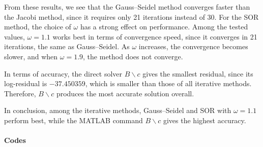 \documentclass{ctexart}
\begin{document}
From these results, we see that the Gauss--Seidel method converges faster than the Jacobi method, since it requires only 21 iterations instead of 30. For the SOR method, the choice of $\omega$ has a strong effect on performance. Among the tested values, $\omega=1.1$ works best in terms of convergence speed, since it converges in 21 iterations, the same as Gauss--Seidel. As $\omega$ increases, the convergence becomes slower, and when $\omega=1.9$, the method does not converge.

In terms of accuracy, the direct solver $B\backslash c$ gives the smallest residual, since its log-residual is $-37.450359$, which is smaller than those of all iterative methods. Therefore, $B\backslash c$ produces the most accurate solution overall.

In conclusion, among the iterative methods, Gauss--Seidel and SOR with $\omega=1.1$ perform best, while the MATLAB command $B\backslash c$ gives the highest accuracy.
\paragraph{Codes}
% 
\end{document}
